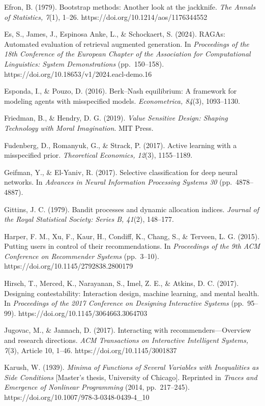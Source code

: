 \documentclass[
  11pt]{article}
\begin{document}
Efron, B. (1979). Bootstrap methods: Another look at the jackknife.
\emph{The Annals of Statistics, 7}(1), 1--26.
https://doi.org/10.1214/aos/1176344552

Es, S., James, J., Espinosa Anke, L., \& Schockaert, S. (2024). RAGAs:
Automated evaluation of retrieval augmented generation. In
\emph{Proceedings of the 18th Conference of the European Chapter of the
Association for Computational Linguistics: System Demonstrations}
(pp.~150--158). https://doi.org/10.18653/v1/2024.eacl-demo.16

Esponda, I., \& Pouzo, D. (2016). Berk--Nash equilibrium: A framework
for modeling agents with misspecified models. \emph{Econometrica,
84}(3), 1093--1130.

Friedman, B., \& Hendry, D. G. (2019). \emph{Value Sensitive Design:
Shaping Technology with Moral Imagination}. MIT Press.

Fudenberg, D., Romanyuk, G., \& Strack, P. (2017). Active learning with
a misspecified prior. \emph{Theoretical Economics, 12}(3), 1155--1189.

Geifman, Y., \& El-Yaniv, R. (2017). Selective classification for deep
neural networks. In \emph{Advances in Neural Information Processing
Systems 30} (pp.~4878--4887).

Gittins, J. C. (1979). Bandit processes and dynamic allocation indices.
\emph{Journal of the Royal Statistical Society: Series B, 41}(2),
148--177.

Harper, F. M., Xu, F., Kaur, H., Condiff, K., Chang, S., \& Terveen, L.
G. (2015). Putting users in control of their recommendations. In
\emph{Proceedings of the 9th ACM Conference on Recommender Systems}
(pp.~3--10). https://doi.org/10.1145/2792838.2800179

Hirsch, T., Merced, K., Narayanan, S., Imel, Z. E., \& Atkins, D. C.
(2017). Designing contestability: Interaction design, machine learning,
and mental health. In \emph{Proceedings of the 2017 Conference on
Designing Interactive Systems} (pp.~95--99).
https://doi.org/10.1145/3064663.3064703

Jugovac, M., \& Jannach, D. (2017). Interacting with
recommenders---Overview and research directions. \emph{ACM Transactions
on Interactive Intelligent Systems, 7}(3), Article 10, 1--46.
https://doi.org/10.1145/3001837

Karush, W. (1939). \emph{Minima of Functions of Several Variables with
Inequalities as Side Conditions} {[}Master's thesis, University of
Chicago{]}. Reprinted in \emph{Traces and Emergence of Nonlinear
Programming} (2014, pp.~217--245).
https://doi.org/10.1007/978-3-0348-0439-4\_10
\end{document}
